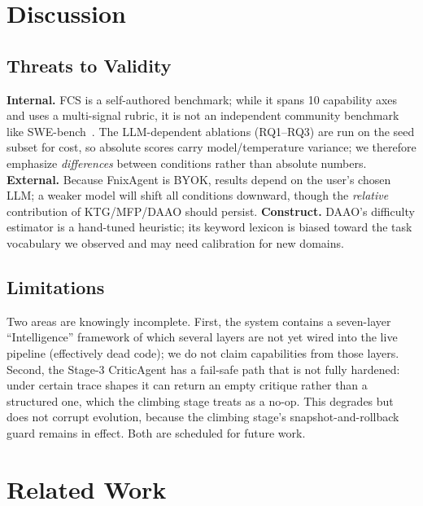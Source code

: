 \documentclass[sigconf]{acmart}
\begin{document}
\section{Discussion}\label{sec:disc}

\subsection{Threats to Validity}
\textbf{Internal.} FCS is a self-authored benchmark; while it spans 10 capability axes and uses a multi-signal rubric, it is not an independent community benchmark like SWE-bench~\cite{jimenez2024swebench}. The LLM-dependent ablations (RQ1--RQ3) are run on the seed subset for cost, so absolute scores carry model/temperature variance; we therefore emphasize \emph{differences} between conditions rather than absolute numbers. \textbf{External.} Because FnixAgent is BYOK, results depend on the user's chosen LLM; a weaker model will shift all conditions downward, though the \emph{relative} contribution of KTG/MFP/DAAO should persist. \textbf{Construct.} DAAO's difficulty estimator is a hand-tuned heuristic; its keyword lexicon is biased toward the task vocabulary we observed and may need calibration for new domains.

\subsection{Limitations}
Two areas are knowingly incomplete. First, the system contains a seven-layer ``Intelligence'' framework of which several layers are not yet wired into the live pipeline (effectively dead code); we do not claim capabilities from those layers. Second, the Stage-3 CriticAgent has a fail-safe path that is not fully hardened: under certain trace shapes it can return an empty critique rather than a structured one, which the climbing stage treats as a no-op. This degrades but does not corrupt evolution, because the climbing stage's snapshot-and-rollback guard remains in effect. Both are scheduled for future work.

\section{Related Work}\label{sec:related}
\end{document}
